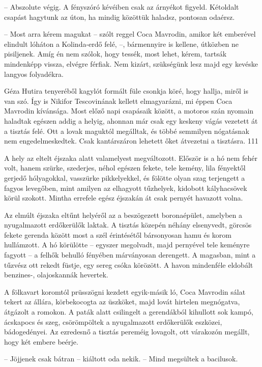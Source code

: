 \documentclass{IEEEtran}
\begin{document}
– Abszolute végig. A fényszóró kévéiben csak az árnyékot figyeld. Kétoldalt
csapást hagytunk az úton, ha mindig közöttük haladsz, pontosan odaérsz.

– Most arra kérem magukat – szólt reggel Coca Mavrodin, amikor két emberével
elindult lóháton a Kolinda-erdő felé, –, bármennyire is kellene, útközben ne
pisiljenek. Amíg én nem szólok, hogy tessék, most lehet, kérem, tartsák
mindenképp vissza, elvégre férfiak. Nem kizárt, szükségünk lesz majd egy
kevéske langyos folyadékra.

Géza Hutira tenyeréből kagylót formált füle csonkja köré, hogy hallja, miről
is van szó. Így is Nikifor Tescovinának kellett elmagyarázni, mi éppen Coca
Mavrodin kívánsága. Most előző napi csapásaik között, a motoros szán nyomain
haladtak egészen addig a helyig, ahonnan már csak egy keskeny vágás vezetett
át a tisztás felé. Ott a lovak maguktól megálltak, és többé semmilyen
nógatásnak nem engedelmeskedtek. Csak kantárszáron lehetett őket átvezetni a
tisztásra.
111

A hely az eltelt éjszaka alatt valamelyest megváltozott. Először is a hó nem
fehér volt, hanem szürke, szederjes, néhol egészen fekete, tele kemény, lila
fényektől gerjedő hólyagokkal, vasszürke pikkelyekkel, és fölötte olyan szag
terjengett a fagyos levegőben, mint amilyen az elhagyott tűzhelyek, kidobott
kályhacsövek körül szokott. Mintha errefele egész éjszakán át csak pernyét
havazott volna.

Az elmúlt éjszaka eltűnt helyéről az a beszögezett boronaépület, amelyben a
nyugalmazott erdőkerülők laktak. A tisztás közepén néhány elsenyvedt, görcsös
fekete gerenda között most a szél érintésétől bársonyosan hamu és korom
hullámzott. A hó körülötte – egyszer megolvadt, majd pernyével tele keményre
fagyott – a felhők behulló fényében márványosan derengett. A magasban, mint a
tűzvész ott rekedt füstje, egy sereg csóka körözött. A havon mindenféle
eldobált benzines-, olajoskannák hevertek.

A fölkavart koromtól prüsszögni kezdett egyik-másik ló, Coca Mavrodin sálat
tekert az állára, körbekocogta az üszköket, majd lovát hirtelen megnógatva,
átgázolt a romokon. A paták alatt csilingelt a gerendákból kihullott sok
kampó, ácskapocs és szeg, csörömpöltek a nyugalmazott erdőkerülők eszközei,
bádogedényei. Az ezredesnő a tisztás pereméig lovagolt, ott várakozón megállt,
hogy két embere beérje.

– Jöjjenek csak bátran – kiáltott oda nekik. – Mind megsültek a bacilusok.
\end{document}
